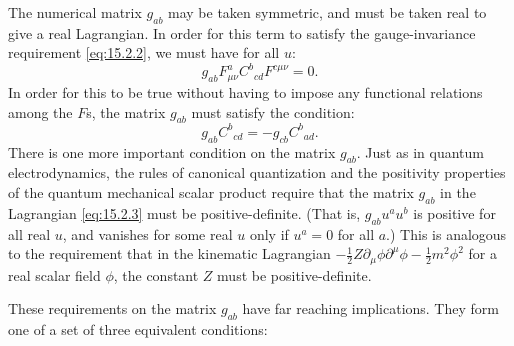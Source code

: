 The numerical matrix $g_{ab}$ may be taken symmetric, and must be taken
real to give a real Lagrangian. In order for this term to satisfy the
gauge-invariance requirement \eqref{eq:15.2.2}, we must have for all $u$:
\[
 g_{ab}F^a_{\mu\nu}C^b{}_{cd}
 F^{c\mu\nu}=0 .
\]
In order for this to be true without having to impose any functional relations
among the $F$s, the matrix $g_{ab}$ must satisfy the condition:
\begin{equation}
 g_{ab}C^b{}_{cd}
 =-g_{cb}C^b{}_{ad} .
 \tag{15.2.4}\label{eq:15.2.4}
\end{equation}
There is one more important condition on the matrix $g_{ab}$. Just as in
quantum electrodynamics, the rules of canonical quantization and the positivity
properties of the quantum mechanical scalar product require that the matrix
$g_{ab}$ in the Lagrangian \eqref{eq:15.2.3} must be positive-definite.
(That is, $g_{ab}u^a u^b$ is positive for all real $u$, and
vanishes for some real $u$ only if $u^a=0$ for all $a$.) This is
analogous to the requirement that in the kinematic Lagrangian
$-\frac12Z\partial_\mu\phi\partial^\mu\phi-\frac12m^2\phi^2$ for a real scalar
field $\phi$, the constant $Z$ must be positive-definite.

These requirements on the matrix $g_{ab}$ have far reaching
implications. They form one of a set of three equivalent conditions:

